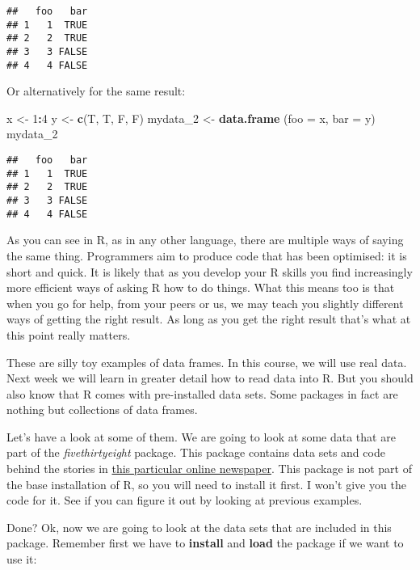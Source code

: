 \documentclass[
]{book}
\newenvironment{Shaded}{\begin{snugshade}}{\end{snugshade}}
\newcommand{\AttributeTok}[1]{\textcolor[rgb]{0.13,0.29,0.53}{#1}}
\newcommand{\DecValTok}[1]{\textcolor[rgb]{0.00,0.00,0.81}{#1}}
\newcommand{\FunctionTok}[1]{\textcolor[rgb]{0.13,0.29,0.53}{\textbf{#1}}}
\newcommand{\NormalTok}[1]{#1}
\newcommand{\OtherTok}[1]{\textcolor[rgb]{0.56,0.35,0.01}{#1}}
\newcommand{\SpecialCharTok}[1]{\textcolor[rgb]{0.81,0.36,0.00}{\textbf{#1}}}
\begin{document}
\begin{verbatim}
##   foo   bar
## 1   1  TRUE
## 2   2  TRUE
## 3   3 FALSE
## 4   4 FALSE
\end{verbatim}

Or alternatively for the same result:

\begin{Shaded}
\begin{Highlighting}[]
\NormalTok{x }\OtherTok{\textless{}{-}} \DecValTok{1}\SpecialCharTok{:}\DecValTok{4}
\NormalTok{y }\OtherTok{\textless{}{-}} \FunctionTok{c}\NormalTok{(T, T, F, F)}
\NormalTok{mydata\_2 }\OtherTok{\textless{}{-}} \FunctionTok{data.frame}\NormalTok{ (}\AttributeTok{foo =}\NormalTok{ x, }\AttributeTok{bar =}\NormalTok{ y)}
\NormalTok{mydata\_2}
\end{Highlighting}
\end{Shaded}

\begin{verbatim}
##   foo   bar
## 1   1  TRUE
## 2   2  TRUE
## 3   3 FALSE
## 4   4 FALSE
\end{verbatim}

As you can see in R, as in any other language, there are multiple ways of saying the same thing. Programmers aim to produce code that has been optimised: it is short and quick. It is likely that as you develop your R skills you find increasingly more efficient ways of asking R how to do things. What this means too is that when you go for help, from your peers or us, we may teach you slightly different ways of getting the right result. As long as you get the right result that's what at this point really matters.

These are silly toy examples of data frames. In this course, we will use real data. Next week we will learn in greater detail how to read data into R. But you should also know that R comes with pre-installed data sets. Some packages in fact are nothing but collections of data frames.

Let's have a look at some of them. We are going to look at some data that are part of the \emph{fivethirtyeight} package. This package contains data sets and code behind the stories in \href{http://fivethirtyeight.com/}{this particular online newspaper}. This package is not part of the base installation of R, so you will need to install it first. I won't give you the code for it. See if you can figure it out by looking at previous examples.

Done? Ok, now we are going to look at the data sets that are included in this package. Remember first we have to \textbf{install} and \textbf{load} the package if we want to use it:
\end{document}
